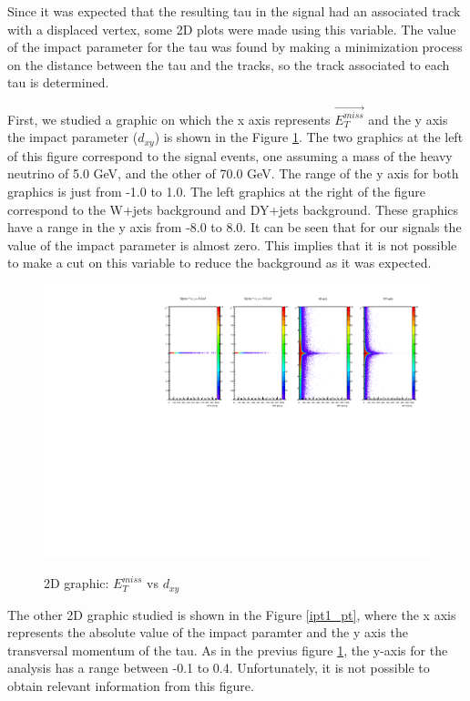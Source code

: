 Since it was expected that the resulting tau in the signal had an associated track with a displaced vertex, some 2D plots were made using this variable. The value of the impact parameter for the tau was found by making a minimization process on the distance between the tau and the tracks, so the track associated to each tau is determined. 

First, we studied a graphic on which the x axis 
represents $\vec{E_T^{miss}}$ and the y axis the impact parameter ($d_{xy}$) is shown in the Figure \ref{ipt1_MET}. The two graphics at the left of this figure correspond to the signal events, one 
assuming a mass of the heavy neutrino of 5.0 GeV, and the other of 70.0 GeV. The range of the y axis for both graphics is just from -1.0 to 1.0. The left graphics at the right of the figure correspond 
to the W+jets background and DY+jets background. These graphics have a range in the y axis from -8.0 to 8.0. It can be seen that for our signals the value of the impact parameter is almost zero. 
This implies that it is not possible to make a cut on this variable to reduce the background as it was expected. 
 
 \begin{figure}[h] 
 \centering
 \caption{2D graphic: $E_T^{miss}$ vs $d_{xy}$}
 \includegraphics[width=1.1\textwidth]{./Capitulos/Analysis/c1} 
 \label{ipt1_MET}
 \end{figure}
 
The other 2D graphic studied is shown in the Figure \ref{ipt1_pt}, where the x axis represents the absolute value of the impact paramter and the y axis the transversal momentum of the tau. As in the previus figure \ref{ipt1_MET}, the y-axis for the analysis has a range between -0.1 to 0.4. Unfortunately, it is not possible to obtain relevant information from this figure.
 
